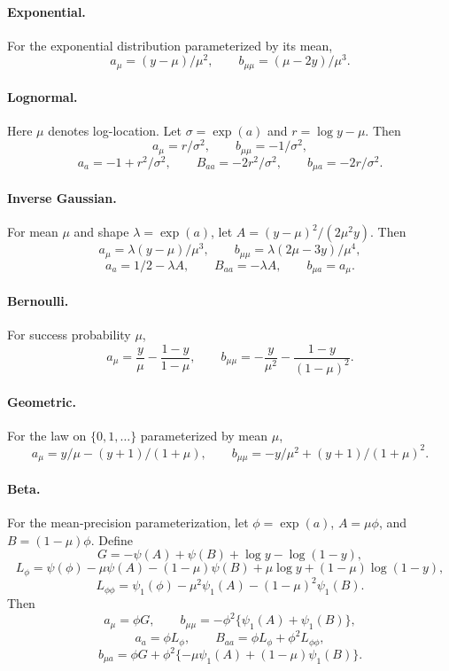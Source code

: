 \documentclass[a4paper,fleqn]{cas-sc}
\begin{document}
\paragraph{Exponential.}
For the exponential distribution parameterized by its mean,
\[
 a_\mu=(y-\mu)/\mu^2,\qquad b_{\mu\mu}=(\mu-2y)/\mu^3.
\]

\paragraph{Lognormal.}
Here $\mu$ denotes log-location. Let $\sigma=\exp(a)$ and $r=\log y-\mu$. Then
\[
 a_\mu=r/\sigma^2,\qquad b_{\mu\mu}=-1/\sigma^2,
\]
\[
 a_a=-1+r^2/\sigma^2,\qquad
 B_{aa}=-2r^2/\sigma^2,\qquad
 b_{\mu a}=-2r/\sigma^2.
\]

\paragraph{Inverse Gaussian.}
For mean $\mu$ and shape $\lambda=\exp(a)$, let $A=(y-\mu)^2/(2\mu^2y)$. Then
\[
 a_\mu=\lambda(y-\mu)/\mu^3,\qquad
 b_{\mu\mu}=\lambda(2\mu-3y)/\mu^4,
\]
\[
 a_a=1/2-\lambda A,\qquad B_{aa}=-\lambda A,\qquad b_{\mu a}=a_\mu.
\]

\paragraph{Bernoulli.}
For success probability $\mu$,
\[
 a_\mu=\frac{y}{\mu}-\frac{1-y}{1-\mu},\qquad
 b_{\mu\mu}=-\frac{y}{\mu^2}-\frac{1-y}{(1-\mu)^2}.
\]

\paragraph{Geometric.}
For the law on $\{0,1,\ldots\}$ parameterized by mean $\mu$,
\[
 a_\mu=y/\mu-(y+1)/(1+\mu),\qquad
 b_{\mu\mu}=-y/\mu^2+(y+1)/(1+\mu)^2.
\]

\paragraph{Beta.}
For the mean-precision parameterization, let $\phi=\exp(a)$, $A=\mu\phi$, and $B=(1-\mu)\phi$. Define
\[
 G=-\psi(A)+\psi(B)+\log y-\log(1-y),
\]
\[
 L_\phi=\psi(\phi)-\mu\psi(A)-(1-\mu)\psi(B)
 +\mu\log y+(1-\mu)\log(1-y),
\]
\[
 L_{\phi\phi}=\psi_1(\phi)-\mu^2\psi_1(A)-(1-\mu)^2\psi_1(B).
\]
Then
\[
 a_\mu=\phi G,\qquad
 b_{\mu\mu}=-\phi^2\{\psi_1(A)+\psi_1(B)\},
\]
\[
 a_a=\phi L_\phi,\qquad B_{aa}=\phi L_\phi+\phi^2L_{\phi\phi},
\]
\[
 b_{\mu a}=\phi G+\phi^2\{-\mu\psi_1(A)+(1-\mu)\psi_1(B)\}.
\]
\end{document}
